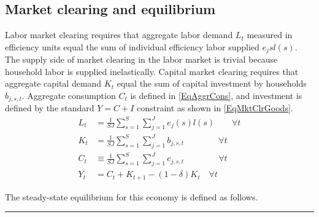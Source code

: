 \documentclass[letterpaper,12pt]{article}
\theoremstyle{definition}
\begin{document}
\begin{spacing}{1.5}
  \subsection{Market clearing and equilibrium}\label{SecMCandEqlbm}

    Labor market clearing requires that aggregate labor demand $L_t$ measured in efficiency units equal the sum of individual efficiency labor supplied $e_j{s}l(s)$. The supply side of market clearing in the labor market is trivial because household labor is supplied inelastically. Capital market clearing requires that aggregate capital demand $K_t$ equal the sum of capital investment by households $b_{j,s,t}$. Aggregate consumption $C_t$ is defined in \eqref{EqAggrCons}, and investment is defined by the standard $Y = C + I$ constraint as shown in \eqref{EqMktClrGoods}.
    \begin{align}
      L_t &= \frac{1}{SJ}\sum_{s=1}^S\sum_{j=1}^{J} e_j(s)l(s) \quad\quad \forall t \label{EqMktClrLab} \\
      K_t &= \frac{1}{SJ}\sum_{s=1}^{S}\sum_{j=1}^{J}b_{j,s,t} \quad\quad\quad\quad \forall t \label{EqMktClrCap} \\
      C_t &\equiv \frac{1}{SJ}\sum_{s=1}^{S}\sum_{j=1}^{J}c_{j,s,t} \quad\quad\quad\quad \forall t \label{EqAggrCons} \\
      Y_t &= C_t + K_{t+1} - (1-\delta)K_t \quad\forall t \label{EqMktClrGoods}
    \end{align}

    The steady-state equilibrium for this economy is defined as follows.

    \vspace{7mm}
    \end{spacing}
    \hrule
\end{document}
